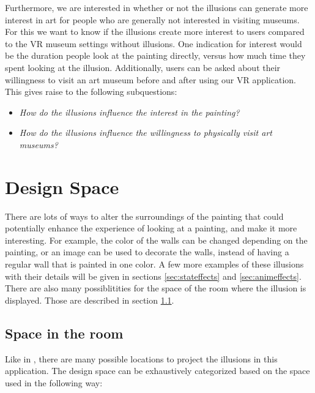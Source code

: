 \documentclass[a4paper]{article}
\begin{document}
Furthermore, we are interested in whether or not the illusions can generate more interest in art for people who are generally not interested in visiting museums. For this we want to know if the illusions create more interest to users compared to the VR museum settings without illusions. One indication for interest would be the duration people look at the painting directly, versus how much time they spent looking at the illusion. Additionally, users can be asked about their willingness to visit an art museum before and after using our VR application. This gives raise to the following subquestions:

\begin{itemize}
\item{\emph{How do the illusions influence the interest in the painting?}}
\item{\emph{How do the illusions influence the willingness to physically visit art museums?}}
\end{itemize}



\section{Design Space}\label{design space}

There are lots of ways to alter the surroundings of the painting that could potentially enhance the experience of looking at a painting, and make it more interesting. For example, the color of the walls can be changed depending on the painting, or an image can be used to decorate the walls, instead of having a regular wall that is painted in one color. A few more examples of these illusions with their details will be given in sections \ref{sec:stateffects} and \ref{sec:animeffects}. There are also many possiblitities for the space of the room where the illusion is displayed. Those are described in section \ref{sec:spaceinroom}. 


\subsection{Space in the room}\label{sec:spaceinroom}
Like in \cite{illumiroom}, there are many possible locations to project the illusions in this application. The design space can be exhaustively categorized based on the space used in the following way:
\end{document}
